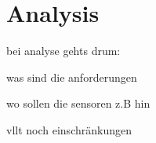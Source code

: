 
\chapter{Analysis}
\label{ch:Analysis}


bei analyse gehts drum: 

was sind die anforderungen

wo sollen die sensoren z.B hin

vllt noch einschränkungen